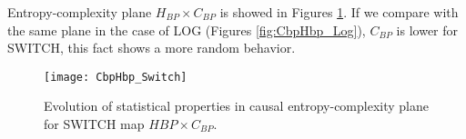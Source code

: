 Entropy-complexity plane $H_{BP} \times C_{BP}$ is showed in Figures \ref{fig:SWITCH_HC}.
If we compare with the same plane in the case of LOG (Figures \ref{fig:CbpHbp_Log}), $C_{BP}$ is lower for SWITCH, this fact shows a more random behavior.
%
\begin{figure}[H]
	\centering
	\texttt{[image: CbpHbp\_Switch]}
	\caption{Evolution of statistical properties in causal entropy-complexity plane for SWITCH map $H{BP} \times C_{BP}$.}
	\label{fig:SWITCH_HC}
\end{figure}
